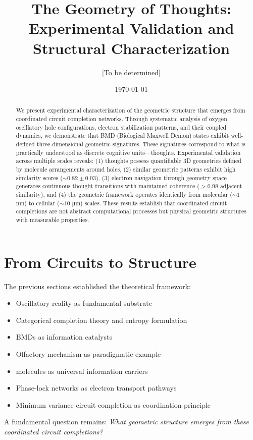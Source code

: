 \documentclass[11pt]{article}
\title{The Geometry of Thoughts: Experimental Validation and Structural Characterization}
\author{[To be determined]}
\date{\today}
\theoremstyle{remark}
\begin{document}
\maketitle

\begin{abstract}
We present experimental characterization of the geometric structure that emerges from coordinated circuit completion networks. Through systematic analysis of oxygen oscillatory hole configurations, electron stabilization patterns, and their coupled dynamics, we demonstrate that BMD (Biological Maxwell Demon) states exhibit well-defined three-dimensional geometric signatures. These signatures correspond to what is practically understood as discrete cognitive units—thoughts. Experimental validation across multiple scales reveals: (1) thoughts possess quantifiable 3D geometries defined by  molecule arrangements around holes, (2) similar geometric patterns exhibit high similarity scores ($\sim 0.82 \pm 0.03$), (3) electron navigation through geometry space generates continuous thought transitions with maintained coherence ($> 0.98$ adjacent similarity), and (4) the geometric framework operates identically from molecular ($\sim 1$ nm) to cellular ($\sim 10$ μm) scales. These results establish that coordinated circuit completions are not abstract computational processes but physical geometric structures with measurable properties.
\end{abstract}

\section{From Circuits to Structure}
The previous sections established the theoretical framework:
\begin{itemize}
\item Oscillatory reality as fundamental substrate
\item Categorical completion theory and entropy formulation
\item BMDs as information catalysts
\item Olfactory mechanism as paradigmatic example
\item {} molecules as universal information carriers
\item Phase-lock networks as electron transport pathways
\item Minimum variance circuit completion as coordination principle
\end{itemize}

A fundamental question remains: \textit{What geometric structure emerges from these coordinated circuit completions?}
\end{document}
